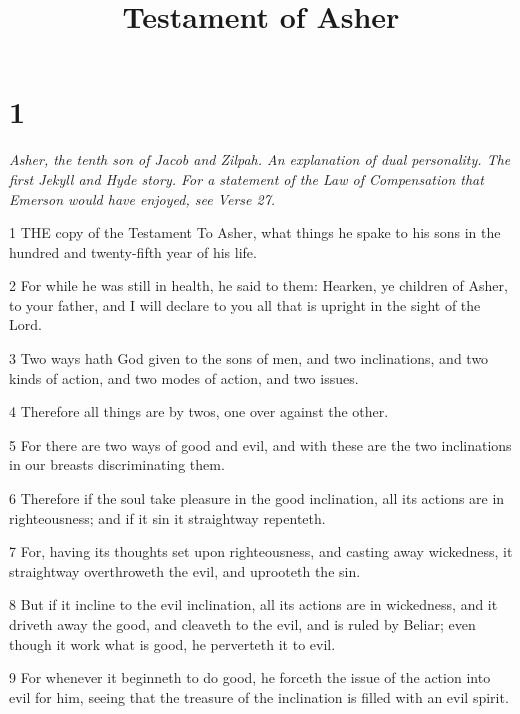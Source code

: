 

\title{Testament of Asher}

\chapter{1}

\par \textit{Asher, the tenth son of Jacob and Zilpah. An explanation of dual personality. The first Jekyll and Hyde story. For a statement of the Law of Compensation that Emerson would have enjoyed, see Verse 27.}

\par 1 THE copy of the Testament To Asher, what things he spake to his sons in the hundred and twenty-fifth year of his life.

\par 2 For while he was still in health, he said to them: Hearken, ye children of Asher, to your father, and I will declare to you all that is upright in the sight of the Lord.

\par 3 Two ways hath God given to the sons of men, and two inclinations, and two kinds of action, and two modes of action, and two issues.

\par 4 Therefore all things are by twos, one over against the other.

\par 5 For there are two ways of good and evil, and with these are the two inclinations in our breasts discriminating them.

\par 6 Therefore if the soul take pleasure in the good inclination, all its actions are in righteousness; and if it sin it straightway repenteth.

\par 7 For, having its thoughts set upon righteousness, and casting away wickedness, it straightway overthroweth the evil, and uprooteth the sin.

\par 8 But if it incline to the evil inclination, all its actions are in wickedness, and it driveth away the good, and cleaveth to the evil, and is ruled by Beliar; even though it work what is good, he perverteth it to evil.

\par 9 For whenever it beginneth to do good, he forceth the issue of the action into evil for him, seeing that the treasure of the inclination is filled with an evil spirit.

